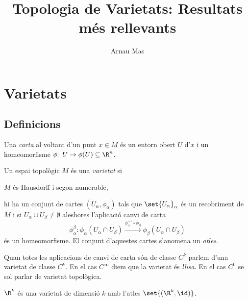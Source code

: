 \documentclass[12pt,twocolumn]{article}
\title{\bfseries \sffamily Topologia de Varietats: Resultats més rellevants}
\author{\sffamily Arnau Mas}
\date{\sffamily 2020}
\begin{document}
\maketitle

\section{Varietats}
\subsection{Definicions}
\begin{definition}[Carta]
	Una \emph{carta} al voltant d'un punt \( x \in M \) és un entorn obert \( U \) d'\( x \)
	i un homeomorfisme \( \phi \colon U \to \phi(U) \subseteq \R^n \). 
\end{definition}

\begin{definition}[Varietat]
	Un espai topològic \( M \) és una \emph{varietat} si
	\begin{points}
	\item \( M \) és Hausdorff i segon numerable,
	\item hi ha un conjunt de cartes \( (U_\alpha, \phi_\alpha) \) tals que \(
		\set{U_\alpha}_\alpha \) és un recobriment de \( M \) i si \( U_\alpha \cup U_\beta
		\neq \emptyset \) aleshores l'aplicació canvi de carta 
		\begin{equation*}
			\phi_\alpha^\beta \colon \phi_\alpha(U_\alpha \cap U_\beta)
			\xrightarrow{\phi_\alpha^{-1} \circ \phi_\beta} \phi_\beta(U_\alpha \cap U_\beta)
		\end{equation*}
		és un homeomorfisme. El conjunt d'aquestes cartes s'anomena un \emph{atles}.
	\end{points}

	Quan totes les aplicacions de canvi de carta són de classe \( C^k \) parlem d'una
	varietat de classe \( C^k \). En el cas \( C^\infty \) diem que la varietat és
	\emph{llisa}. En el cas \( C^0 \) se sol parlar de varietat topològica.
\end{definition}

\begin{example}
	\( \R^k \) és una varietat de dimensió \( k \) amb l'atles \( \set{(\R^k, \id)}	\).
\end{example}
\end{document}
